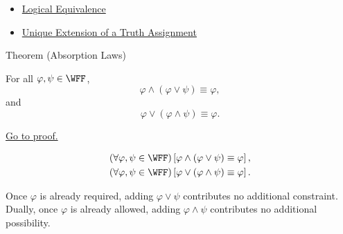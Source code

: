 \begin{dependencies}
\begin{itemize}
  \item \hyperref[def:logical-equivalence-propositional-logic]{Logical Equivalence}
  \item \hyperref[thm:unique-extension-truth-assignment-propositional-logic]{Unique Extension of a Truth Assignment}
\end{itemize}
\end{dependencies}
\begin{theorembox}{Theorem (Absorption Laws)}
\begin{theorem}
\label{thm:absorption-laws-propositional-logic}
For all \(\varphi,\psi\in\WFF\),
\[
\varphi\land(\varphi\lor\psi)\equiv\varphi,
\]
and
\[
\varphi\lor(\varphi\land\psi)\equiv\varphi.
\]

\noindent\hyperref[prf:absorption-laws-propositional-logic]{Go to proof.}
\end{theorem}
\end{theorembox}

\begin{remark*}
\[
\begin{gathered}
(\forall\varphi,\psi\in\WFF)
\left[
\varphi\land(\varphi\lor\psi)\equiv\varphi
\right],\\
(\forall\varphi,\psi\in\WFF)
\left[
\varphi\lor(\varphi\land\psi)\equiv\varphi
\right].
\end{gathered}
\]
\end{remark*}

\begin{remark*}[Interpretation]
Once \(\varphi\) is already required, adding \(\varphi\lor\psi\) contributes no additional constraint. Dually, once \(\varphi\) is already allowed, adding \(\varphi\land\psi\) contributes no additional possibility.
\end{remark*}

